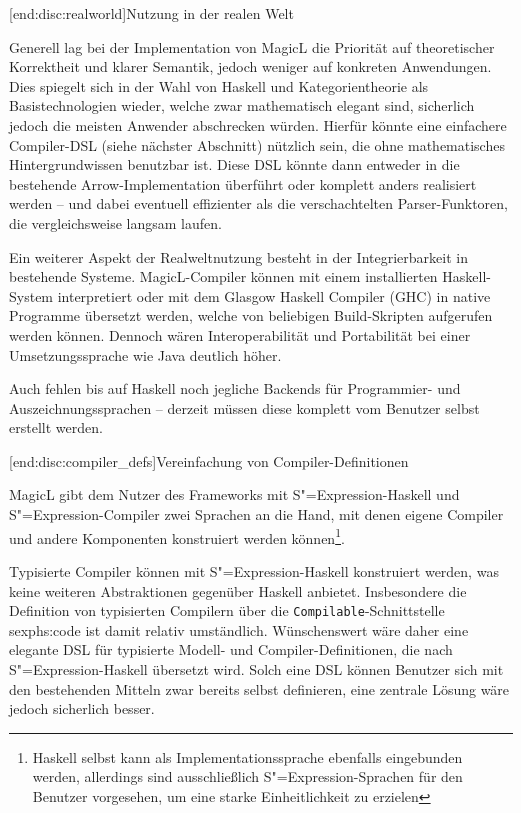 \documentclass[12pt, a4paper, bibgerm]{scrbook}
\newcommand\icode[1]{\lstinline?#1?}
\newcommand\lsubsection{}
\newcommand\sref{}
\newcommand{\sexp}{S"=Expression}
\begin{document}
\lsubsection[end:disc:realworld]{Nutzung in der realen Welt}

Generell lag bei der Implementation von MagicL die Priorität auf
theoretischer Korrektheit und klarer Semantik, jedoch weniger auf
konkreten Anwendungen. Dies spiegelt sich in der Wahl von Haskell und
Kategorientheorie als Basistechnologien wieder, welche zwar mathematisch
elegant sind, sicherlich jedoch die meisten Anwender abschrecken
würden. Hierfür könnte eine einfachere Compiler-DSL (siehe nächster
Abschnitt) nützlich sein, die ohne mathematisches Hintergrundwissen
benutzbar ist. Diese DSL könnte dann entweder in die bestehende
Arrow-Implementation überführt oder komplett anders realisiert werden --
und dabei eventuell effizienter als die verschachtelten
Parser-Funktoren, die vergleichsweise langsam laufen.

Ein weiterer Aspekt der Realweltnutzung besteht in der Integrierbarkeit
in bestehende Systeme. MagicL-Compiler können mit einem installierten
Haskell-System interpretiert oder mit dem Glasgow Haskell Compiler
(GHC) \cite{Ghc} in native Programme übersetzt werden, welche von
beliebigen Build-Skripten aufgerufen werden können. Dennoch wären
Interoperabilität und Portabilität bei einer Umsetzungssprache wie
Java deutlich höher.

Auch fehlen bis auf Haskell noch jegliche Backends für Programmier- und
Auszeichnungssprachen -- derzeit müssen diese komplett vom Benutzer
selbst erstellt werden.

\lsubsection[end:disc:compiler_defs]{Vereinfachung von
  Compiler-Definitionen} 

MagicL gibt dem Nutzer des Frameworks mit \sexp{}-Haskell und
\sexp{}-Compiler zwei Sprachen an die Hand, mit denen eigene Compiler
und andere Komponenten konstruiert werden können\footnote{Haskell selbst
  kann als Implementationssprache ebenfalls eingebunden werden,
  allerdings sind ausschließlich \sexp{}-Sprachen für den Benutzer
  vorgesehen, um eine starke Einheitlichkeit zu erzielen}.

Typisierte Compiler können mit \sexp{}-Haskell konstruiert werden, was
keine weiteren Abstraktionen gegenüber Haskell anbietet. Insbesondere
die Definition von typisierten Compilern über die
\icode{Compilable}-Schnittstelle \sref{sexphs:code} ist damit relativ
umständlich. Wünschenswert wäre daher eine elegante DSL für typisierte
Modell- und Compiler-Definitionen, die nach \sexp{}-Haskell übersetzt
wird. Solch eine DSL können Benutzer sich mit den bestehenden Mitteln
zwar bereits selbst definieren, eine zentrale Lösung wäre jedoch
sicherlich besser.
\end{document}
